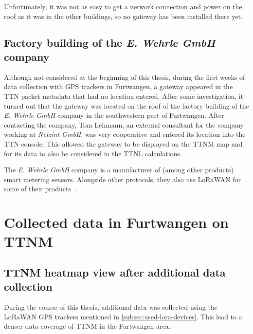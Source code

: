 Unfortunately, it was not as easy to get a network connection and power on the roof as it was in the other buildings, so no gateway has been installed there yet.

\subsection{Factory building of the \emph{E. Wehrle GmbH} company}\label{subsec:factory-building-of-the-e-wehrle-company}

Although not considered at the beginning of this thesis, during the first weeks of data collection with \ac{GPS} trackers in Furtwangen, a gateway appeared in the \ac{TTN} packet metadata that had no location entered.
After some investigation, it turned out that the gateway was located on the roof of the factory building of the \emph{E. Wehrle GmbH} company in the southwestern part of Furtwangen.
After contacting the company, Tom Lehmann, an external consultant for the company working at \emph{Netzint GmbH}, was very cooperative and entered its location into the \ac{TTN} console.
This allowed the gateway to be displayed on the \ac{TTNM} map and for its data to also be considered in the \ac{TTNL} calculations.

The \emph{E. Wehrle GmbH} company is a manufacturer of (among other products) smart metering sensors.
Alongside other protocols, they also use \ac{LoRaWAN} for some of their products~\cite{e_wehrle_gmbh_wecount-s_nodate}.

\section{Collected data in Furtwangen on \acl{TTNM}}\label{sec:collected-data-in-furtwangen-on-ttnm}

\subsection{\acl{TTNM} heatmap view after additional data collection}\label{sec:ttm_heatmap_after}

During the course of this thesis, additional data was collected using the \ac{LoRaWAN} \ac{GPS} trackers mentioned in \cref{subsec:used-lora-devices}.
This lead to a denser data coverage of \acl{TTNM} in the Furtwangen area.

